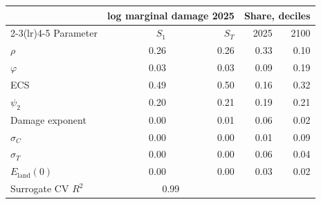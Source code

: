 \begin{tabular}{lrrrr}
\toprule
 & \multicolumn{2}{c}{log marginal damage 2025} & \multicolumn{2}{c}{Share, deciles} \\
\cmidrule(lr){2-3}\cmidrule(lr){4-5}
Parameter & $S_1$ & $S_T$ & 2025 & 2100 \\
\midrule
$\rho$ & 0.26 & 0.26 & 0.33 & 0.10 \\
$\varphi$ & 0.03 & 0.03 & 0.09 & 0.19 \\
ECS & 0.49 & 0.50 & 0.16 & 0.32 \\
$\psi_2$ & 0.20 & 0.21 & 0.19 & 0.21 \\
Damage exponent & 0.00 & 0.01 & 0.06 & 0.02 \\
$\sigma_C$ & 0.00 & 0.00 & 0.01 & 0.09 \\
$\sigma_T$ & 0.00 & 0.00 & 0.06 & 0.04 \\
$E_{\mathrm{land}}(0)$ & 0.00 & 0.00 & 0.03 & 0.02 \\
\midrule
Surrogate CV $R^2$ & \multicolumn{2}{c}{0.99} & & \\
\bottomrule
\end{tabular}
